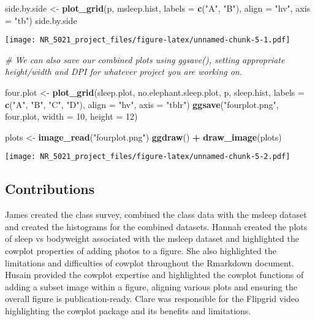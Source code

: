 \documentclass[]{article}
\newenvironment{Shaded}{\begin{snugshade}}{\end{snugshade}}
\newcommand{\KeywordTok}[1]{\textcolor[rgb]{0.13,0.29,0.53}{\textbf{#1}}}
\newcommand{\DataTypeTok}[1]{\textcolor[rgb]{0.13,0.29,0.53}{#1}}
\newcommand{\DecValTok}[1]{\textcolor[rgb]{0.00,0.00,0.81}{#1}}
\newcommand{\StringTok}[1]{\textcolor[rgb]{0.31,0.60,0.02}{#1}}
\newcommand{\CommentTok}[1]{\textcolor[rgb]{0.56,0.35,0.01}{\textit{#1}}}
\newcommand{\OperatorTok}[1]{\textcolor[rgb]{0.81,0.36,0.00}{\textbf{#1}}}
\newcommand{\NormalTok}[1]{#1}
\begin{document}
\begin{Shaded}
\begin{Highlighting}[]
\NormalTok{side.by.side <-}\StringTok{ }\KeywordTok{plot_grid}\NormalTok{(p, msleep.hist, }\DataTypeTok{labels =} \KeywordTok{c}\NormalTok{(}\StringTok{"A"}\NormalTok{, }\StringTok{"B"}\NormalTok{), }\DataTypeTok{align =} \StringTok{"hv"}\NormalTok{, }\DataTypeTok{axis =} \StringTok{"tb"}\NormalTok{)}
\NormalTok{side.by.side}
\end{Highlighting}
\end{Shaded}

\texttt{[image: NR\_5021\_project\_files/figure-latex/unnamed-chunk-5-1.pdf]}

\begin{Shaded}
\begin{Highlighting}[]
\CommentTok{# We can also save our combined plots using ggsave(), setting appropriate height/width and DPI for whatever project you are working on.}

\NormalTok{four.plot <-}\StringTok{ }\KeywordTok{plot_grid}\NormalTok{(sleep.plot, no.elephant.sleep.plot, p, sleep.hist, }\DataTypeTok{labels =} \KeywordTok{c}\NormalTok{(}\StringTok{"A"}\NormalTok{, }\StringTok{"B"}\NormalTok{, }\StringTok{"C"}\NormalTok{, }\StringTok{"D"}\NormalTok{), }\DataTypeTok{align =} \StringTok{"hv"}\NormalTok{, }\DataTypeTok{axis =} \StringTok{"tblr"}\NormalTok{)}
\KeywordTok{ggsave}\NormalTok{(}\StringTok{"fourplot.png"}\NormalTok{, four.plot, }\DataTypeTok{width =} \DecValTok{10}\NormalTok{, }\DataTypeTok{height =} \DecValTok{12}\NormalTok{)}

\NormalTok{plots <-}\StringTok{ }\KeywordTok{image_read}\NormalTok{(}\StringTok{"fourplot.png"}\NormalTok{)}
\KeywordTok{ggdraw}\NormalTok{() }\OperatorTok{+}\StringTok{ }\KeywordTok{draw_image}\NormalTok{(plots)}
\end{Highlighting}
\end{Shaded}

\texttt{[image: NR\_5021\_project\_files/figure-latex/unnamed-chunk-5-2.pdf]}

\subsection{Contributions}\label{contributions}

James created the class survey, combined the class data with the msleep
dataset and created the histograms for the combined datasets. Hannah
created the plots of sleep vs bodyweight associated with the msleep
dataset and highlighted the cowplot properties of adding photos to a
figure. She also highlighted the limitations and difficulties of cowplot
throughout the Rmarkdown document. Husain provided the cowplot expertise
and highlighted the cowplot functions of adding a subset image within a
figure, aligning various plots and ensuring the overall figure is
publication-ready. Clare was responsible for the Flipgrid video
highlighting the cowplot package and its benefits and limitations.
\end{document}

